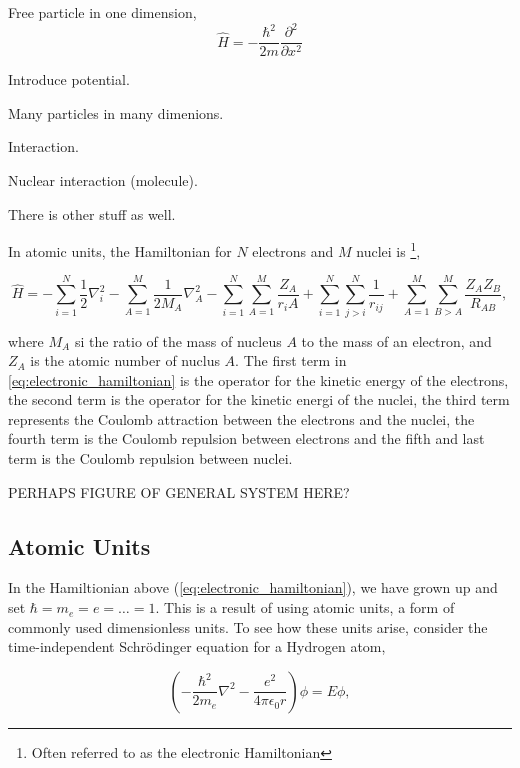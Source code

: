     Free particle in one dimension,
    \begin{equation}
        \hat{H} = -\frac{\hbar^2}{2m} \frac{\partial^2}{\partial x^2}
    \end{equation}

    Introduce potential.

    Many particles in many dimenions.

    Interaction.

    Nuclear interaction (molecule).

    There is other stuff as well.

    In atomic units, the Hamiltonian for $N$ electrons and $M$ nuclei is
    \footnote{Often referred to as the electronic Hamiltonian},

    \begin{equation}
        \label{eq:electronic_hamiltonian}
        \hat{H} = 
            - \sum_{i=1}^N \frac{1}{2} \nabla _i^2 
            - \sum_{A=1}^M \frac{1}{2M_A} \nabla_A^2
            - \sum_{i=1}^N\sum_{A=1}^M \frac{Z_A}{r_iA}
            + \sum_{i=1}^N\sum_{j>i}^N \frac{1}{r_{ij}}
            + \sum_{A=1}^M\sum_{B>A}^M \frac{Z_A Z_B}{R_{AB}},
    \end{equation}

    where $M_A$ si the ratio of the mass of nucleus $A$ to the mass of an electron,
    and $Z_A$ is the atomic number of nuclus $A$. The first term in 
    \autoref{eq:electronic_hamiltonian} is the operator for the kinetic energy of 
    the electrons, the second term is the operator for the kinetic energi of the 
    nuclei, the third term represents the Coulomb attraction between the electrons
    and the nuclei, the fourth term is the Coulomb repulsion between electrons 
    and the fifth and last term is the Coulomb repulsion between nuclei.

    PERHAPS FIGURE OF GENERAL SYSTEM HERE?

    \subsection{Atomic Units}

        In the Hamiltionian above (\autoref{eq:electronic_hamiltonian}), we have grown up
        and set $\hbar = m_e = e = \dots = 1$. This is a result of using atomic units, a
        form of commonly used dimensionless units. To see how these units arise, consider
        the time-independent Schrödinger equation for a Hydrogen atom,

        \begin{equation}
            \left(-\frac{\hbar^2}{2m_e}\nabla^2 - \frac{e^2}{4\pi\epsilon_0 r} \right)
            \phi = E\phi,
        \end{equation}

